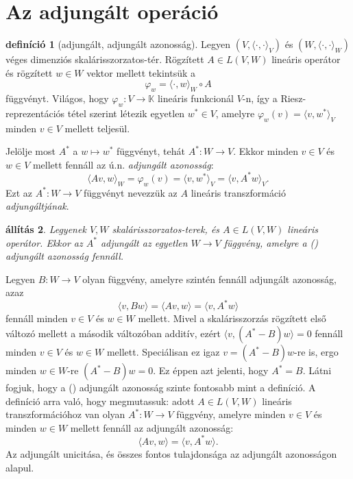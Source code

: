 \documentclass[a4paper, showtrims]{memoir}
\makeatletter
\renewenvironment{proof}[1][\proofname]
    {\par\pushQED{\qed}%
    \normalfont \topsep6\p@\@plus6\p@\relax
    \trivlist
    \item[\hskip\labelsep
        \itshape
    #1\@addpunct{:}]\ignorespaces}
    {\popQED\endtrivlist\@endpefalse}
\theoremstyle{plain}
\newtheorem{proposition}{állítás}[chapter]
\theoremstyle{remark}
\theoremstyle{definition}
\newtheorem{definition}[proposition]{definíció}
\newcommand{\ip}[2]{\langle#1,#2\rangle}
\makeatother
\begin{document}
\section{Az adjungált operáció}
\begin{definition}[adjungált, adjungált azonosság]
	Legyen $\left( V,\ip{\cdot}{\cdot}_V \right)$ és
	$\left( W,\ip{\cdot}{\cdot}_W \right)$ véges dimenziós ska\-láris\-szor\-zatos-tér.
	Rögzített $A\in L\left( V,W \right)$ lineáris operátor és rögzített $w\in W$ vektor mellett tekintsük a
	\[
		\varphi_w=
		\ip{\cdot}{w}_W\circ A
	\]
	függvényt.
	Világos, hogy $\varphi_w:V\to\mathbb{K}$ lineáris funkcionál $V$-n,
	így a Riesz-reprezentációs tétel szerint létezik egyetlen $w^\ast\in V$,
	amelyre
	$\varphi_w\left( v \right)=\ip{v}{w^\ast}_V$ minden $v\in V$ mellett teljesül.

	Jelölje most $A^\ast$ a $w\mapsto w^\ast$ függvényt, tehát
	$A^\ast:W\to V$.
	Ekkor minden $v\in V$ és $w\in V$ mellett fennáll az ú.n. \emph{adjungált azonosság}:
	\[
		\ip{Av}{w}_W
		=
		\varphi_w\left( v \right)
		=
		\ip{v}{w^\ast}_V
		=
		\ip{v}{A^\ast w}_V.\tag{\dag}
	\]
	Ezt az $A^\ast:W\to V$ függvényt nevezzük az $A$ lineáris transzformáció \emph{adjungáltjának}.
\end{definition}
\begin{proposition}
	Legyenek $V,W$ skalárisszorzatos-terek, és $A\in L\left( V,W \right)$ lineáris operátor.
	Ekkor az $A^\ast$ adjungált az egyetlen $W\to V$ függvény,
	amelyre a (\dag) adjungált azonosság fennáll.
\end{proposition}
\begin{proof}
	Legyen $B:W\to V$ olyan függvény, amelyre szintén fennáll adjungált azonosság,
	azaz
	\[
		\ip{v}{Bw}
		=
		\ip{Av}{w}
		=
		\ip{v}{A^\ast w}
	\]
	fennáll minden $v\in V$ és $w\in W$ mellett.
	Mivel a skalárisszorzás rögzített első változó mellett a második változóban additív,
	ezért
	$\ip{v}{\left( A^\ast-B \right)w}=0$ fennáll minden $v\in V$ és $w\in W$ mellett.
	Speciálisan ez igaz $v=\left( A^\ast-B \right)w$-re is, ergo minden $w\in W$-re
	$\left( A^\ast-B \right)w=0$.
	Ez éppen azt jelenti, hogy $A^\ast=B$.
\end{proof}
Látni fogjuk, hogy a (\dag) adjungált azonosság szinte fontosabb mint a definíció.
A definíció arra való, hogy megmutassuk: adott $A\in L\left( V,W \right)$ lineáris transzformációhoz van olyan
$A^\ast:W\to V$ függvény, amelyre minden $v\in V$ és minden $w\in W$ mellett fennáll az adjungált azonosság:
\[
	\ip{Av}{w}
	=
	\ip{v}{A^\ast w}.
	\tag{\dag}
\]
Az adjungált unicitása, és összes fontos tulajdonsága az adjungált azonosságon alapul.
\end{document}
